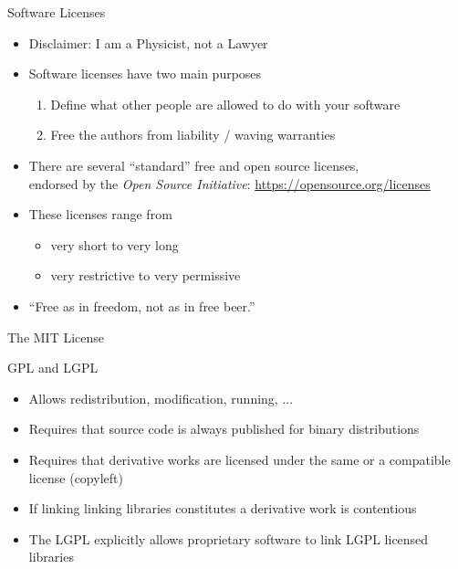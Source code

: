 \begin{frame}[c]{Software Licenses}
  \begin{itemize}
    \item Disclaimer: I am a Physicist, not a Lawyer
    \item Software licenses have two main purposes
      \begin{enumerate}
        \item Define what other people are allowed to do with your software
        \item Free the authors from liability / waving warranties
      \end{enumerate}
    \item There are several \enquote{standard} free and open source licenses,\\
      endorsed by the \emph{Open Source Initiative}: \url{https://opensource.org/licenses}
    \item These licenses range from
      \begin{itemize}
        \item very short to very long
        \item very restrictive to very permissive
      \end{itemize}
    \item \enquote{Free as in freedom, not as in free beer.}
  \end{itemize}
\end{frame}

\begin{frame}[c]{The MIT License}
  \small
  
\end{frame}

\begin{frame}[c]{GPL and LGPL}
  \begin{itemize}
    \item Allows redistribution, modification, running, ...
    \item Requires that source code is always published for binary distributions
    \item Requires that derivative works are licensed under the same or a compatible license (copyleft)
    \item If linking linking libraries constitutes a derivative work is contentious
    \item The LGPL explicitly allows proprietary software to link LGPL licensed libraries
  \end{itemize}
\end{frame}

